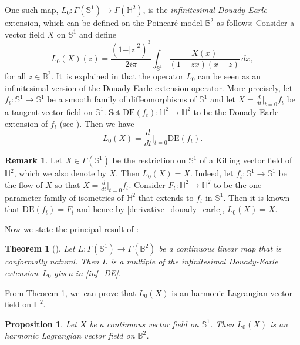 \documentclass[11pt]{article}
\theoremstyle{plain}
\newtheorem{theorem}[cor]{Theorem}
\newtheorem{prop}[cor]{Proposition}
\theoremstyle{definition}
\newtheorem{remark}[cor]{Remark}
\begin{document}
One such map, $L_0:\Gamma(\mathbb{S}^1) \to \Gamma(\mathbb{H}^2)$, is the \emph{infinitesimal Douady-Earle} extension, which can be defined on the Poincaré model $\mathbb{B}^2$ as follows: Consider a vector field $X$ on $\mathbb{S}^1$ and define
\begin{equation}\label{inf_DE}
L_0(X)(z)=\frac{(1-\vert z\vert^2)^3}{2i\pi}\int_{\mathbb{S}^1}\frac{X(x)}{(1-\overline{z}x)(x-z)}\,dx,
\end{equation}
for all $z\in\mathbb{B}^2$. It~is explained in \cite{Uniqueness_of_operator_L} that the operator $L_0$ can be seen as an infinitesimal version of the Douady-Earle extension operator. More precisely, let \hbox{$f_t: \mathbb{S}^1 \to \mathbb{S}^1$} be a smooth family of diffeomorphisms of $\mathbb{S}^1$ and let $X = \frac{d}{dt}\big|_{t=0} f_t$ be a tangent vector field on $\mathbb{S}^1$. Set $\mathrm{DE}(f_t): \mathbb{H}^2 \to \mathbb{H}^2$ to be the Douady-Earle extension of $f_t$ (see \cite{Douady_Earle}). Then we have
\begin{equation}\label{derivative_douady_earle}
L_0(X)=\frac{d}{dt}\Big\lvert_{ t=0} \mathrm{DE}(f_t).
\end{equation}

\begin{remark}\label{douadyearly_killing}
Let $X \in \Gamma(\mathbb{S}^1)$ be the restriction on $\mathbb{S}^1$ of a Killing vector field of $\mathbb{H}^2$, which we also denote by $X$. Then $L_0(X)=X$. Indeed, let $f_t:\mathbb{S}^1\to\mathbb{S}^1$ be the flow of $X$ so that $X=\frac{d}{dt}\big\lvert_{t=0}f_t$. Consider $F_t: \mathbb{H}^2 \to \mathbb{H}^2$ to be the one-parameter family of isometries of $\mathbb{H}^2$ that extends to $f_t$ in $\mathbb{S}^1$. Then it is known that $\mathrm{DE}(f_t) = F_t$ and hence by \eqref{derivative_douady_earle}, $L_0(X)=X$.
\end{remark}
Now we state the principal result of \cite{Uniqueness_of_operator_L}:

\begin{theorem}[\cite{Uniqueness_of_operator_L}]\label{Uniqueness}
Let $L:\Gamma(\mathbb{S}^1) \to \Gamma(\mathbb{B}^2)$ be a continuous linear map that is conformally natural. Then $L$ is a multiple of the infinitesimal Douady-Earle extension~$L_0$ given in \eqref{inf_DE}.
\end{theorem}
From Theorem \ref{Uniqueness}, we~can prove that $L_0(X)$ is an harmonic Lagrangian vector field on $\mathbb{H}^2$.
\begin{prop}\label{L_0_harmonic_lagrangian}
Let $X$ be a continuous vector field on $\mathbb{S}^1$. Then $L_0(X)$ is an harmonic Lagrangian vector field on $\mathbb{B}^2$.
\end{prop}
\end{document}
